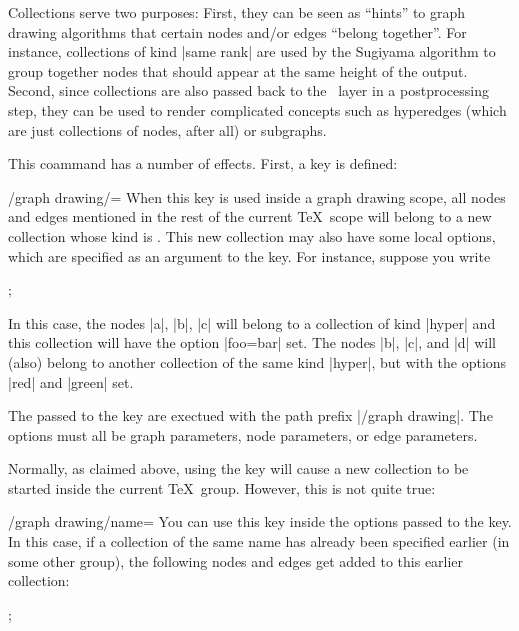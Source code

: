 Collections serve two purposes: First, they can be seen as ``hints''
to graph drawing algorithms that certain nodes and/or edges ``belong
together''. For instance, collections of kind |same rank| are used
by the Sugiyama algorithm to group together nodes that should appear
at the same height of the output. Second, since collections are also
passed back to the \pgfname\ layer in a postprocessing step, they can be
used to render complicated concepts such as hyperedges (which are
just collections of nodes, after all) or subgraphs.


\begin{command}{\pgfgddeclarecollectionkind{}}
  This coammand has a number of effects. First, a key is defined:

  \begin{key}{/graph drawing/=}
    When this key is used inside a graph drawing scope, all nodes and
    edges mentioned in the rest of 
    the current \TeX\ scope will belong to a new collection whose kind
    is . This new collection may also have some local
    options, which are specified as an argument to the key. For
    instance, suppose you write
\begin{codeexample}
;
\end{codeexample}

    In this case, the nodes |a|, |b|, |c| will belong to a collection of
    kind |hyper| and this collection will have the option |foo=bar|
    set. The nodes |b|, |c|, and |d| will (also) belong to another
    collection of the same kind |hyper|, but with the options |red| and
    |green| set.
    
    The  passed to the key are exectued with the path
    prefix |/graph drawing|. The options must all be graph parameters,
    node parameters, or edge parameters.
    
    Normally, as claimed above, using the key will cause a new
    collection to be started inside the current \TeX\ group. However,
    this is not quite true:
  
    \begin{key}{/graph drawing/name=}
      You can use this key inside the options passed to the key. In this
      case, if a collection 
      of the same name has already been specified earlier (in some other
      group), the following nodes and edges get added to this earlier
      collection:
\begin{codeexample}
;
\end{codeexample}


\end{key}
\end{key}
\end{command}
